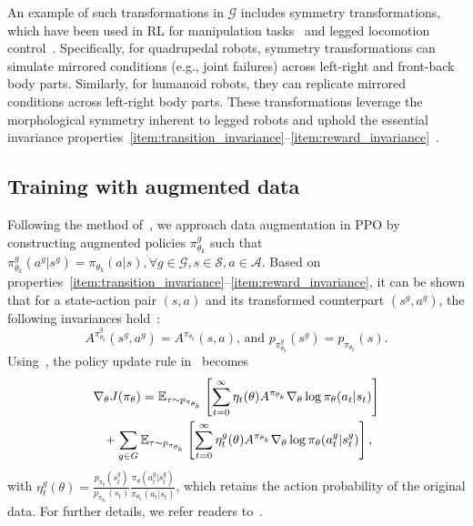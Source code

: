 An example of such transformations in \( \mathcal{G} \) includes symmetry transformations, which have been used in RL for manipulation tasks~\citep{lin2020invariantTER} and legged locomotion control~\citep{Mittal2024SymmetryCF, Su2024LeveragingSym}. 
Specifically, for quadrupedal robots, symmetry transformations can simulate mirrored conditions (e.g., joint failures) across left-right and front-back body parts. 
Similarly, for humanoid robots, they can replicate mirrored conditions across left-right body parts. 
These transformations leverage the morphological symmetry inherent to legged robots and uphold the essential invariance properties~\ref{item:transition_invariance}--\ref{item:reward_invariance}~\citep{ordonez2024morphological}.

\subsection{Training with augmented data}
Following the method of~\citet{Mittal2024SymmetryCF}, we approach data augmentation in PPO by constructing augmented policies \( \pi_{\theta_k}^g \) such that
\(
\pi_{\theta_k}^g(a^g | s^g) = \pi_{\theta_k}(a | s), \forall g \in \mathcal{G}, s \in \mathcal{S}, a \in \mathcal{A}.
\)
Based on properties~\ref{item:transition_invariance}--\ref{item:reward_invariance}, it can be shown that for a state-action pair \( (s, a)\) and its transformed counterpart \((s^g, a^g)\), the following invariances hold~\citep{Mittal2024SymmetryCF}:
\begin{equation}
    \label{eq:advantage_state_prob_invariance}
     A^{\pi_{\theta_k}^g}(s^g, a^g) = A^{\pi_{\theta_k}}(s, a)\text{, and }
    p_{\pi_{\theta_k}^g}(s^g) = p_{\pi_{\theta_k}}(s).
\end{equation}
Using~, the policy update rule in~ becomes
\begin{align}
    \label{eq:policy_update_final}
    \nabla_{\theta} J(\pi_{\theta}) &= \mathbb{E}_{\tau \sim p_{\pi_{\theta_k}}} \left[ \sum_{t=0}^{\infty} \eta_t(\theta) A^{\pi_{\theta_k}} \nabla_{\theta} \log \pi_{\theta}(a_t | s_t) \right] \nonumber \\
    &\hspace{-3em} + \sum_{g \in G} \mathbb{E}_{\tau \sim p_{\pi_{\theta_k}}} \left[ \sum_{t=0}^{\infty} \eta_t^g(\theta) A^{\pi_{\theta_k}} \nabla_{\theta} \log \pi_{\theta}(a_t^g | s_t^g) \right],
\end{align}
with
\(
\eta_t^g(\theta) = \frac{p_{\pi_{\theta}}(s_t^g)}{p_{\pi_{\theta_k}}(s_t)} \frac{\pi_{\theta}(a_t^g | s_t^g)}{\pi_{\theta_k}(a_t | s_t)}
\), which retains the action probability of the original data.
For further details, we refer readers to~\citep{Mittal2024SymmetryCF}.

